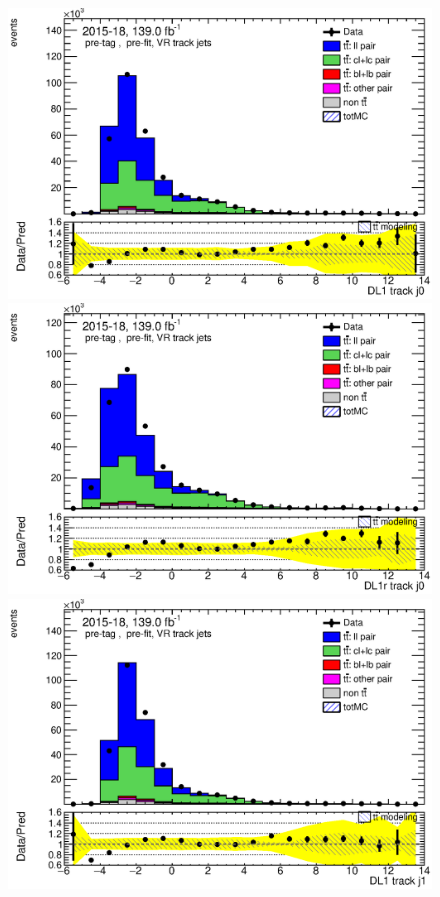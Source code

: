 \documentclass[letterpaper,12pt]{article}
\begin{document}
\begin{figure}[h]
	\begin{minipage}[b]{.45\textwidth}
	\centering
	\includegraphics[width=1\textwidth]{Oct_distributions/pretagNoRwDL1rwithhighpTVRJets_scaledall/DataMC__J0_DL1.eps}
	\end{minipage}\hfill
	\begin{minipage}[b]{.45\textwidth}
	\centering
	\includegraphics[width=1\textwidth]{Oct_distributions/pretagNoRwDL1rwithhighpTVRJets_scaledall/DataMC__J0_DL1r.eps}
	\end{minipage}\hfill
	\begin{minipage}[b]{.45\textwidth}
	\centering
	\includegraphics[width=1\textwidth]{Oct_distributions/pretagNoRwDL1rwithhighpTVRJets_scaledall/DataMC__J1_DL1.eps}

\end{minipage}
\end{figure}
\end{document}
